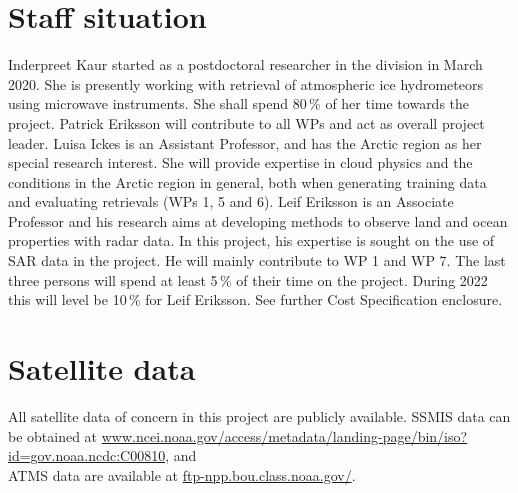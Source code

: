 \documentclass[12pt,oneside,a4paper]{article}
\begin{document}
\section{Staff situation}
%
\label{sec:staff}
Inderpreet Kaur started as a postdoctoral researcher in the division in March
2020. She is presently working with retrieval of atmospheric ice hydrometeors
using microwave instruments. She shall spend 80\,\% of her time towards the
project. Patrick Eriksson will contribute to all WPs and act as overall project
leader. Luisa Ickes is an Assistant Professor, and has the Arctic region as her
special research interest. She will provide expertise in cloud physics and the
conditions in the Arctic region in general, both when generating training data
and evaluating retrievals (WPs 1, 5 and 6). Leif Eriksson is an Associate
Professor and his research aims at developing methods to observe land and ocean
properties with radar data. In this project, his expertise is sought on the use
of SAR data in the project. He will mainly contribute to WP 1 and WP 7. The
last three persons will spend at least 5\,\% of their time on the project.
During 2022 this will level be 10\,\% for Leif Eriksson. See further Cost
Specification enclosure.



\section{Satellite data}
%
All satellite data of concern in this project are publicly available. SSMIS
data can be obtained at
\url{www.ncei.noaa.gov/access/metadata/landing-page/bin/iso?id=gov.noaa.ncdc:C00810},
and\\ATMS data are available at \url{ftp-npp.bou.class.noaa.gov/}.

{\footnotesize
	
}
\end{document}

